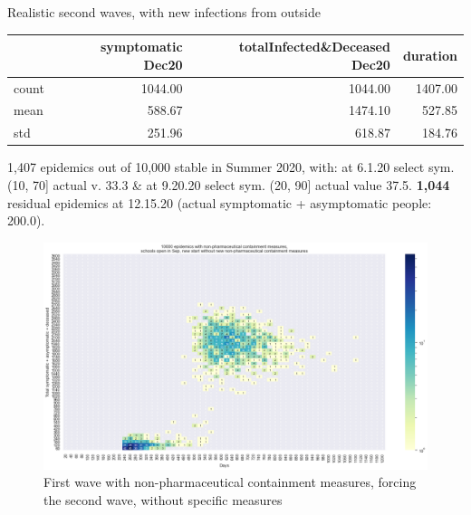 \documentclass[8pt]{beamer}
\begin{document}
\begin{frame}{Realistic second waves, with new infections from outside}



\begin{table}[H]
\center
\tiny

\begin{tabular}{lrrr}
\toprule
{} &  symptomatic Dec20 &  totalInfected\&Deceased Dec20 &  duration \\
\midrule
count &  1044.00 &                    1044.00 & 1407.00 \\
mean  &   588.67 &                    1474.10 &  527.85 \\
std   &   251.96 &                     618.87 &  184.76 \\
\bottomrule
\end{tabular}

\label{selForceWave2Tab}
\end{table}

{\tiny
1,407 epidemics out of 10,000  stable in Summer 2020, with: at 6.1.20 select sym. (10, 70] actual v. 33.3 \& at 9.20.20 select sym. (20, 90] actual value 37.5. \textbf{1,044} residual epidemics at 12.15.20 (actual symptomatic +  asymptomatic people: 200.0).}


\begin{figure}[H]
\center
\includegraphics[scale=0.19]{10kForceWave2.png}
\caption{First wave with non-pharmaceutical containment measures, forcing the second wave, without specific measures} 
\label{selForceWave2}
\end{figure}

\end{frame}
\end{document}
